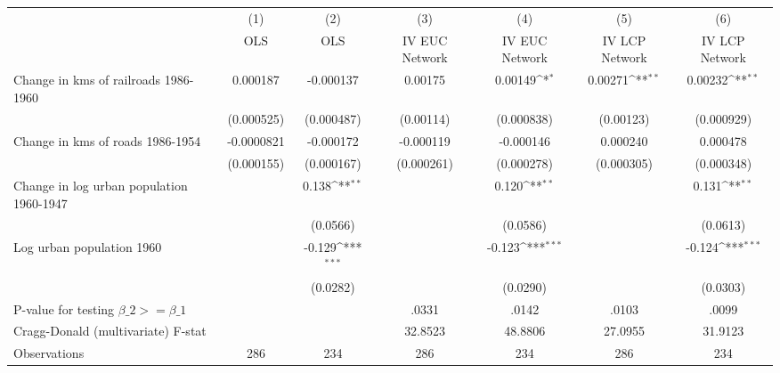 {
\def\sym#1{\ifmmode^{#1}\else\(^{#1}\)\fi}
\begin{tabular}{l*{6}{c}}
\hline\hline
                &\multicolumn{1}{c}{(1)}&\multicolumn{1}{c}{(2)}&\multicolumn{1}{c}{(3)}&\multicolumn{1}{c}{(4)}&\multicolumn{1}{c}{(5)}&\multicolumn{1}{c}{(6)}\\
                &\multicolumn{1}{c}{OLS}&\multicolumn{1}{c}{OLS}&\multicolumn{1}{c}{IV EUC Network}&\multicolumn{1}{c}{IV EUC Network}&\multicolumn{1}{c}{IV LCP Network}&\multicolumn{1}{c}{IV LCP Network}\\
\hline
Change in kms of railroads 1986-1960& 0.000187         &-0.000137         &  0.00175         &  0.00149\sym{*}  &  0.00271\sym{**} &  0.00232\sym{**} \\
                &(0.000525)         &(0.000487)         &(0.00114)         &(0.000838)         &(0.00123)         &(0.000929)         \\
[1em]
Change in kms of roads 1986-1954&-0.0000821         &-0.000172         &-0.000119         &-0.000146         & 0.000240         & 0.000478         \\
                &(0.000155)         &(0.000167)         &(0.000261)         &(0.000278)         &(0.000305)         &(0.000348)         \\
[1em]
Change in log urban population 1960-1947&                  &    0.138\sym{**} &                  &    0.120\sym{**} &                  &    0.131\sym{**} \\
                &                  & (0.0566)         &                  & (0.0586)         &                  & (0.0613)         \\
[1em]
Log urban population 1960&                  &   -0.129\sym{***}&                  &   -0.123\sym{***}&                  &   -0.124\sym{***}\\
                &                  & (0.0282)         &                  & (0.0290)         &                  & (0.0303)         \\
\hline
P-value for testing $\beta\_{2} >= \beta\_{1}$&                  &                  &    .0331         &    .0142         &    .0103         &    .0099         \\
Cragg-Donald (multivariate) F-stat&                  &                  &  32.8523         &  48.8806         &  27.0955         &  31.9123         \\
Observations    &      286         &      234         &      286         &      234         &      286         &      234         \\
\hline\hline
\end{tabular}
}
